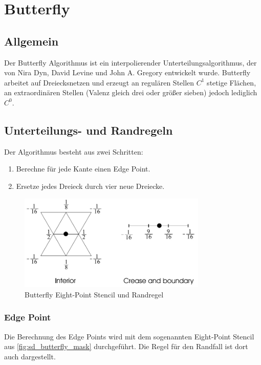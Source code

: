 \section{Butterfly} \label{sec:butterfly}

\subsection{Allgemein}

Der Butterfly Algorithmus ist ein interpolierender Unterteilungsalgorithmus,
der von Nira Dyn, David Levine und John A. Gregory entwickelt wurde.
Butterfly arbeitet auf Dreiecksnetzen und erzeugt an regulären Stellen
\(C^1\) stetige Flächen, an extraordinären Stellen
(Valenz gleich drei oder größer sieben) jedoch lediglich \(C^0\).
\cite[S. 64ff]{Standford.24.07.2015} \cite[S. 72ff]{Zorin.subdivcourse}
\cite{Seeger01asub-atomic}
\cite{Gamasutra}
\cite{Sharp}
\cite{Zorin:1996:ISM:237170.237254}

\subsection{Unterteilungs- und Randregeln}

Der Algorithmus besteht aus zwei Schritten:
\begin{enumerate}
\item Berechne für jede Kante einen Edge Point.
\item Ersetze jedes Dreieck durch vier neue Dreiecke.
\end{enumerate}

\begin{figure}
\centering
\includegraphics[width=0.8\textwidth]{content/media/sd_butterfly_mask.jpg}
\caption{Butterfly Eight-Point Stencil und Randregel \cite{Seeger01asub-atomic}}
\label{fig:sd_butterfly_mask}
\end{figure}

\subsubsection*{Edge Point}
Die Berechnung des Edge Points wird mit dem sogenannten Eight-Point Stencil
aus \autoref{fig:sd_butterfly_mask} durchgeführt.
Die Regel für den Randfall ist dort auch dargestellt.


